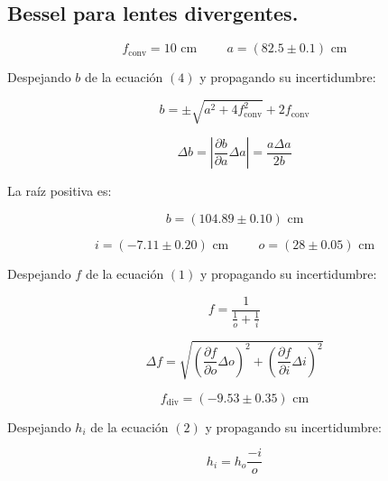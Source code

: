 \documentclass[DIV=calc, paper=a4, fontsize=10pt]{scrartcl}
\begin{document}
\subsection*{\textcolor{carmine}{Bessel para lentes divergentes.}}

\begin{equation*}
    f_{\text{conv}}= 10 \text{ cm} \hspace{1cm} a = (82.5 \pm 0.1) \text{ cm}
\end{equation*}

Despejando $b$ de la ecuación $(4)$ y propagando su incertidumbre:

\begin{equation*}
    b = \pm \sqrt{a^2 + 4f_{\text{conv}}^{2}} + 2f_{\text{conv}}
\end{equation*}

\begin{equation*}
    \Delta b = \left| \frac{\partial b}{\partial a}\Delta a\right|= \frac{a \Delta a}{2b}
\end{equation*}

La raíz positiva es:

\begin{equation*}
    b = (104.89 \pm 0.10) \text{ cm} 
\end{equation*}

\begin{equation*}
    i = (-7.11 \pm 0.20) \text{ cm} \hspace{1cm} o = (28 \pm 0.05) \text{ cm}
\end{equation*}

Despejando $f$ de la ecuación $(1)$ y propagando su incertidumbre:

\begin{equation*}
    f= \frac{1}{\frac{1}{o}+\frac{1}{i}}
\end{equation*}

\begin{equation*}
    \Delta f = \sqrt{\left(\frac{\partial f}{\partial o}\Delta o\right)^{2} + \left(\frac{\partial f}{\partial i}\Delta i\right)^{2}}
\end{equation*}


\begin{equation*}
    f_{\text{div}} =(-9.53 \pm 0.35 ) \text{ cm}
\end{equation*}

Despejando $h_i$ de la ecuación $(2)$ y propagando su incertidumbre:

\begin{equation*}
    h_i = h_o \frac{-i}{o}
\end{equation*}
\end{document}
